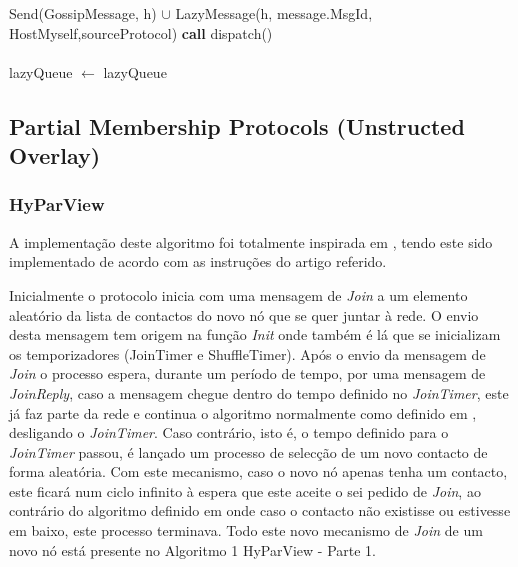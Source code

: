 \begin{algorithm}
\begin{algorithmic}[1]
     \State Send(GossipMessage, h) $\cup$ LazyMessage(h, message.MsgId, HostMyself,sourceProtocol)
     \State \textbf{call} dispatch()
     \EndFor
   
\EndFunction

    \paragraph{}


    \State lazyQueue $\leftarrow$ lazyQueue
    \EndFor
\EndFunction
	  
\end{algorithmic}
\end{algorithm}



\subsection{Partial Membership Protocols (Unstructed Overlay)}

\subsubsection{HyParView}
A implementação deste algoritmo foi totalmente inspirada em \cite{hyparview}, tendo este sido implementado de acordo com as instruções do artigo referido.

Inicialmente o protocolo inicia com uma mensagem de \textit{Join} a um elemento aleatório da lista de contactos do novo nó que se quer juntar à rede. O envio desta mensagem tem origem na função \textit{Init} onde também é lá que se inicializam os temporizadores (JoinTimer e ShuffleTimer). Após o envio da mensagem de \textit{Join} o processo espera, durante um período de tempo, por uma mensagem de \textit{JoinReply}, caso a mensagem chegue dentro do tempo definido no \textit{JoinTimer}, este já faz parte da rede e continua o algoritmo normalmente como definido em \cite{hyparview}, desligando o \textit{JoinTimer}. Caso contrário, isto é, o tempo definido para o \textit{JoinTimer} passou, é lançado um processo de selecção de um novo contacto de forma aleatória. Com este mecanismo, caso o novo nó apenas tenha um contacto, este ficará num ciclo infinito à espera que este aceite o sei pedido de \textit{Join}, ao contrário do algoritmo definido em \cite{hyparview} onde caso o contacto não existisse ou estivesse em baixo, este processo terminava. Todo este novo mecanismo de \textit{Join} de um novo nó está presente no Algoritmo 1 HyParView - Parte 1.

